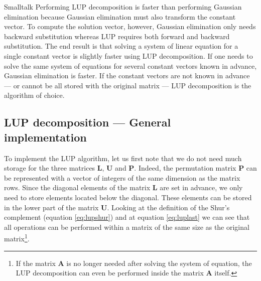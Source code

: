 \begin{displaycode}{Smalltalk}
Performing LUP decomposition is faster than performing Gaussian
elimination because Gaussian elimination must also transform the
constant vector. To compute the solution vector, however, Gaussian
elimination only needs backward substitution whereas LUP requires
both forward and backward substitution. The end result is that
solving a system of linear equation for a single constant vector
is slightly faster using LUP decomposition. If one needs to solve
the same system of equations for several constant vectors known in
advance, Gaussian elimination is faster. If the constant vectors
are not known in advance --- or cannot be all stored with the
original matrix --- LUP decomposition is the algorithm of choice.

\subsection{LUP decomposition --- General implementation}
To implement the LUP algorithm, let us first note that we do not need much storage for the three matrices $\textbf{L}$, $\textbf{U}$ and $\textbf{P}$.
Indeed, the permutation matrix
$\textbf{P}$ can be represented with a vector of integers of the same
dimension as the matrix rows. Since the diagonal elements of the
matrix $\textbf{L}$ are set in advance, we only need to store
elements located below the diagonal. These elements can be stored
in the lower part of the matrix $\textbf{U}$. Looking at the
definition of the Shur's complement (equation \ref{eq:lupshur})
and at equation \ref{eq:luplast} we can see that all operations
can be performed within a matrix of the same size as the original
matrix\footnote{If the matrix $\textbf{A}$ is no longer needed after
solving the system of equation, the LUP decomposition can even be
performed inside the matrix $\textbf{A}$ itself.}.


\end{displaycode}
